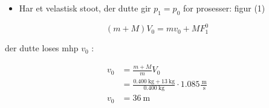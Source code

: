 \documentclass[10pt]{article}
\begin{document}
\begin{itemize}
  \item Har et velastisk stoot, der dutte gir $p_{1}=p_{0}$ for prosesser: figur (1)
\end{itemize}

$$
(m+M) V_{0}=m v_{0}+M F_{1}^{0}
$$

der dutte loses mhp $v_{0}$ :

$$
\begin{aligned}
v_{0} & =\frac{m+M}{m} V_{0} \\
& =\frac{0.400 \mathrm{~kg}+13 \mathrm{~kg}}{0.400 \mathrm{~kg}} \cdot 1.085 \frac{\mathrm{~m}}{\mathrm{~s}} \\
v_{0} & =36 \mathrm{~m}
\end{aligned}
$$
\end{document}
